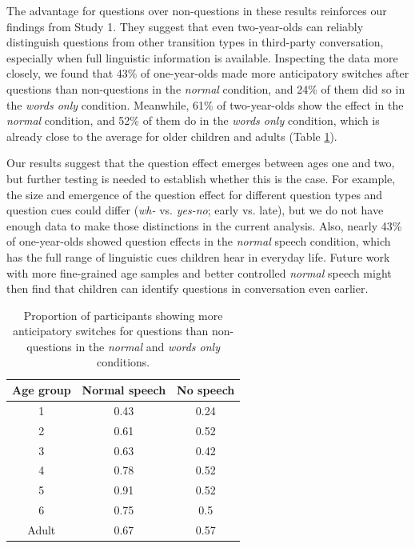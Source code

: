 \documentclass[authoryear, 12pt]{elsarticle}
\begin{document}
The advantage for questions over non-questions in these results reinforces our findings from Study 1. They suggest that even two-year-olds can reliably distinguish questions from other transition types in third-party conversation, especially when full linguistic information is available. Inspecting the data more closely, we found that 43\% of one-year-olds made more anticipatory switches after questions than non-questions in the \textit{normal} condition, and 24\% of them did so in the \textit{words only} condition. Meanwhile, 61\% of two-year-olds show the effect in the \textit{normal} condition, and 52\% of them do in the \textit{words only} condition, which is already close to the average for older children and adults (Table \ref{tab:questioneffectexp2}).

Our results suggest that the question effect emerges between ages one and two, but further testing is needed to establish whether this is the case. For example, the size and emergence of the question effect for different question types and question cues could differ (\textit{wh-} vs. \textit{yes-no}; early vs. late), but we do not have enough data to make those distinctions in the current analysis. Also, nearly 43\% of one-year-olds showed question effects in the \textit{normal} speech condition, which has the full range of linguistic cues children hear in everyday life. Future work with more fine-grained age samples and better controlled \textit{normal} speech might then find that children can identify questions in conversation even earlier.

\begin{table}[t]
\begin{center}
  \begin{tabular}{ccc}
    \hline
    Age group & Normal speech & No speech \\ 
    \hline
    1 & 0.43 & 0.24 \\
    2 & 0.61 & 0.52 \\
    3 & 0.63 & 0.42 \\
    4 & 0.78 & 0.52 \\
    5 & 0.91 & 0.52 \\
    6 & 0.75 & 0.5 \\
    Adult & 0.67 & 0.57 \\
    \hline
  \end{tabular}
\end{center}
  \caption{Proportion of participants showing more anticipatory switches for questions than non-questions in the \textit{normal} and \textit{words only} conditions.}
\label{tab:questioneffectexp2}
\end{table}
\end{document}
